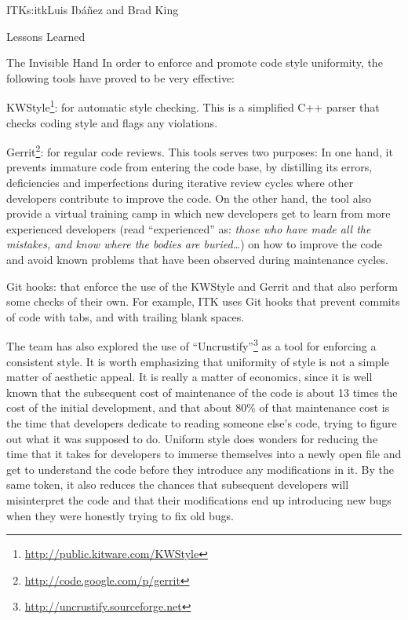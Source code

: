 \begin{aosachapter}{ITK}{s:itk}{Luis Ib\'{a}\~{n}ez and Brad King}
\begin{aosasect1}{Lessons Learned}
\begin{aosasect2}{The Invisible Hand}
In order to enforce and promote code style uniformity, the following tools have
proved to be very effective:

\begin{aosaitemize}
\item KWStyle\footnote{\url{http://public.kitware.com/KWStyle}}: for automatic
style checking. This is a simplified C++ parser that checks coding style and
flags any violations.
\item Gerrit\footnote{\url{http://code.google.com/p/gerrit}}: for regular code
reviews. This tools serves two purposes: In one hand, it prevents immature
code from entering the code base, by distilling its errors, deficiencies and
imperfections during iterative review cycles where other developers contribute
to improve the code. On the other hand, the tool also provide a virtual
training camp in which new developers get to learn from more experienced
developers (read ``experienced'' as: \emph{those who have made all the
mistakes, and know where the bodies are buried\ldots}) on how to improve the
code and avoid known problems that have been observed during maintenance
cycles.
\item Git hooks: that enforce the use of the KWStyle and Gerrit and that also
perform some checks of their own. For example, ITK uses Git hooks that prevent
commits of code with tabs, and with trailing blank spaces.
\end{aosaitemize}

The team has also explored the use of
``Uncrustify''\footnote{\url{http://uncrustify.sourceforge.net}} as a tool for
enforcing a consistent style. It is worth emphasizing that uniformity of style
is not a simple matter of aesthetic appeal. It is really a matter of economics,
since it is well known that the subsequent cost of maintenance of the code is
about 13 times the cost of the initial development, and that about 80\% of that
maintenance cost is the time that developers dedicate to reading someone else's
code, trying to figure out what it was supposed to do. Uniform style does
wonders for reducing the time that it takes for developers to immerse
themselves into a newly open file and get to understand the code before they
introduce any modifications in it. By the same token, it also reduces the
chances that subsequent developers will misinterpret the code and that their
modifications end up introducing new bugs when they were honestly trying to fix
old bugs.


\end{aosasect2}
\end{aosasect1}
\end{aosachapter}
